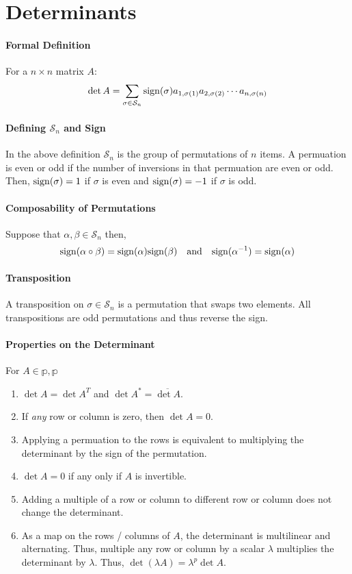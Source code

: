 
\section{Determinants}

\paragraph{Formal Definition}
For a \( n \times n \) matrix \( A \): \[
    \det A = \sum_{\sigma \in \mathcal{S}_n}
    \mathrm{sign}(\sigma) a_{1, \sigma(1)} a_{2, \sigma(2)} \cdots a_{n, \sigma(n)}
\]

\paragraph{Defining \(\mathcal{S}_n\) and Sign}
In the above definition \(\mathcal{S}_n\) is the group of permutations of \( n \)
items. A permuation is even or odd if the number of inversions in that
permuation are even or odd.
Then, \(\mathrm{sign}(\sigma) = 1\) if \(\sigma\) is even and \(\mathrm{sign}(\sigma) = -1\) if
\(\sigma\) is odd.


\paragraph{Composability of Permutations}
Suppose that \( \alpha, \beta \in \mathcal{S}_n \) then, \[
    \mathrm{sign}(\alpha \circ \beta) = \mathrm{sign}(\alpha) \mathrm{sign}(\beta)
    \quad\text{and}\quad
    \mathrm{sign}(\alpha^{-1}) = \mathrm{sign}(\alpha)
\]

\paragraph{Transposition}
A transposition on \( \sigma \in \mathcal{S}_n \) is a permutation that swaps
two elements. All transpositions are odd permutations and thus reverse the sign.

\paragraph{Properties on the Determinant}
For \( A \in \mathbb{p, p} \)
\begin{enumerate}
    \item \(\det A = \det A^T\) and \( \det A^* = \overline{\det A} \).
    \item If \textit{any} row or column is zero, then \( \det A = 0 \).
    \item Applying a permuation to the rows is equivalent to multiplying the
        determinant by the sign of the permutation.
    \item \( \det A = 0 \) if any only if \( A \) is invertible.
    \item Adding a multiple of a row or column to different row or column
        does not change the determinant.
    \item As a map on the rows / columns of \( A \), the determinant is multilinear
    and alternating. Thus, multiple any row or column by a scalar \( \lambda \) multiplies
    the determinant by \( \lambda \). Thus, \( \det (\lambda A) = \lambda^p \det A \).
\end{enumerate}

